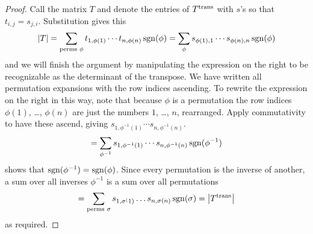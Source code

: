 \begin{proof}
Call the matrix \( T \) and denote the entries of \( {{T}^{\rm trans}} \) with
\( s \)'s so that \( t_{i,j}=s_{j,i} \).
Substitution gives this
\begin{equation*}
  \deter{T}
  =\sum_{\text{perms }\phi} t_{1,\phi(1)}\cdots t_{n,\phi(n)}
          \sgn(\phi)    
  =\sum_{\phi} s_{\phi(1),1}\cdots s_{\phi(n),n}
          \sgn(\phi)
\end{equation*}
and we will finish the argument by manipulating the expression on the right
to be recognizable as the determinant of the transpose.
We have written all permutation expansions 
with the row indices ascending.
To rewrite the expression on the right in this way, note that 
because $\phi$ is a permutation 
the row indices $\phi(1)$, \ldots, $\phi(n)$
are just the numbers $1$, \ldots, $n$, rearranged. 
Apply commutativity to have these ascend, giving
$s_{1,\phi^{-1}(1)}\cdots s_{n,\phi^{-1}(n)}$.
\begin{equation*}
  =\sum_{\phi^{-1}}
     s_{1,\phi^{-1}(1)}\cdots s_{n,\phi^{-1}(n)} \operatorname{sgn}(\phi^{-1})
\end{equation*}
shows that \( \operatorname{sgn}(\phi^{-1})=\operatorname{sgn}(\phi) \).
Since every permutation is the inverse of another,
a sum over all inverses $\phi^{-1}$ is a sum over all permutations
\begin{equation*}
  =\sum_{\text{perms }\sigma}
     s_{1,\sigma^(1)}\dots s_{n,\sigma(n)} \sgn(\sigma)  
  =\deter{\trans{T}}
\end{equation*}
as required.
\end{proof}


